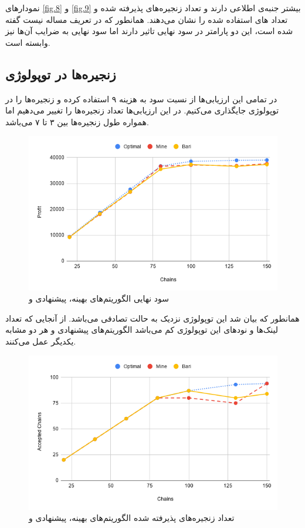 نمودارهای \ref{fig.8} و \ref{fig.9}
بیشتر جنبه‌ی اطلاعی دارند و تعداد زنجیره‌های پذیرفته شده و تعداد
های
استفاده شده را نشان می‌دهند.
همانطور که در تعریف مساله نیست گفته شده است، این دو پارامتر در سود نهایی تاثیر دارند
اما سود نهایی به ضرایب آن‌ها نیز وابسته است.

\subsection{زنجیره‌ها در توپولوژی }

در تمامی این ارزیابی‌ها از نسبت سود به هزینه ۹ استفاده کرده و
زنجیره‌ها را در توپولوژی  جایگذاری می‌کنیم.
در این ارزیابی‌ها تعداد زنجیره‌ها را تغییر می‌دهیم اما همواره طول زنجیره‌ها بین ۳ تا ۷ می‌باشد.


\begin{figure}[h]
\center\includegraphics[scale=.5]{images/chart-6}
\caption{سود نهایی الگوریتم‌های بهینه، پیشنهادی و \cite{Bari2015}}
\label{fig.11}
\end{figure}

همانطور که بیان شد این توپولوژی نزدیک به حالت تصادفی می‌باشد.
از آنجایی که تعداد لینک‌ها و نودهای این توپولوژی کم می‌باشد الگوریتم‌های پیشنهادی و \cite{Bari2015} هر دو مشابه یکدیگر عمل می‌کنند.


\begin{figure}[h]
\center\includegraphics[scale=.5]{images/chart-7}
\caption{تعداد زنجیره‌های پذیرفته شده الگوریتم‌های بهینه، پیشنهادی و \cite{Bari2015}}
\label{fig.12}
\end{figure}

